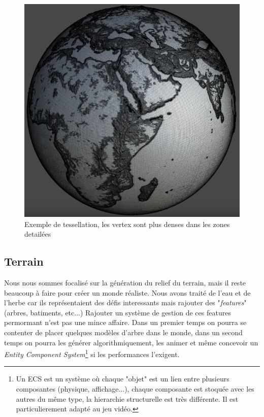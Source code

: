 \documentclass[11pt]{article} %
\begin{document}
\begin{figure}[h]
	\centering
	\includegraphics[scale=.4]{tessellation}
	\caption{Exemple de tessellation, les vertex sont plus denses dans les zones detailées\cite{tessellation}}
	\label{fig:tessellation_example}
\end{figure}

\subsection{Terrain}

Nous nous sommes focalisé sur la génération du relief du terrain, mais il reste beaucoup à faire pour créer un monde réaliste. Nous avons traité de l'eau et de l'herbe car ils représentaient des défis interessants mais rajouter des "\textit{features}" (arbres, batiments, etc...) Rajouter un système de gestion de ces features permormant n'est pas une mince affaire. Dans un premier temps on pourra se contenter de placer quelques modèles d'arbre dans le monde, dans un second temps on pourra les générer algorithmiquement, les animer et même concevoir un \textit{Entity Component System}\footnote{Un ECS est un système où chaque "objet" est un lien entre plusieurs composantes (physique, affichage...), chaque composante est stoquée avec les autres du même type, la hierarchie structurelle est très différente. Il est particulierement adapté au jeu vidéo.} si les performances l'exigent.
\end{document}
